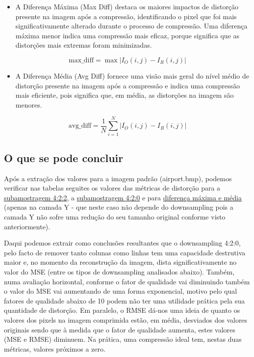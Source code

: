 \documentclass{article}
\begin{document}
\begin{itemize}
    \item A Diferença Máxima (Max Diff) destaca os maiores impactos de distorção presente na imagem após a compressão, identificando o pixel que foi mais significativamente alterado durante o processo de compressão. Uma diferença máxima menor indica uma compressão mais eficaz, porque significa que as distorções mais extremas foram minimizadas.
\end{itemize}

\begin{equation}
\text{max\_diff} = \max |I_O(i, j) - I_R(i, j)|
\end{equation}

\begin{itemize}
    \item A Diferença Média (Avg Diff) fornece uma visão mais geral do nível médio de distorção presente na imagem após a compressão e indica uma compressão mais eficiente, pois significa que, em média, as distorções na imagem são menores.
\end{itemize}

\begin{equation}
\text{avg\_diff} = \frac{1}{N} \sum_{i=1}^{N} |I_O(i, j) - I_R(i, j)|
\end{equation}

\subsection{O que se pode concluir}
Após a extração dos valores para a imagem padrão (airport.bmp), podemos verificar nas tabelas seguites os valores das métricas de distorção para a  \hyperref[tab:tabela4]{subamostragem 4:2:2}, a \hyperref[tab:tabela5]{subamostragem 4:2:0} e para \hyperref[tab:tabela6]{diferença máxima e média} (apenas na camada Y - que neste caso não depende do downsampling pois a camada Y não sofre uma redução do seu tamanho original conforme visto anteriormente). 

Daqui podemos extrair como conclusões resultantes que o downsampling 4:2:0, pelo facto de remover tanto colunas como linhas tem uma capacidade destrutiva maior e, no momento da reconstrução da imagem, dista significativamente no valor do MSE (entre os tipos de downsampling analisados abaixo). Também, numa avaliação horizontal, conforme o fator de qualidade vai diminuindo também o valor do MSE vai aumentando de uma forma exponencial, motivo pelo qual fatores de qualidade abaixo de 10 podem não ter uma utilidade prática pela sua quantidade de distorção. Em paralelo, o RMSE dá-nos uma ideia de quanto os valores dos pixels na imagem comprimida estão, em média, desviados dos valores originais sendo que à medida que o fator de qualidade aumenta, estes valores (MSE e RMSE) diminuem. Na prática, uma compressão ideal tem, nestas duas métricas, valores próximos a zero.
\end{document}
